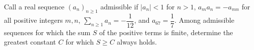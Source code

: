 Call a real sequence $(a_n)_{n\ge1}$ admissible if $|a_n|<1$ for $n>1$, $a_ma_n=-a_{mn}$ for all positive integers $m,n$, $\sum_{n\ge1}a_n=-\dfrac{1}{12}$, and $a_{67}=\dfrac{1}{7}$. Among admissible sequences for which the sum $S$ of the positive terms is finite, determine the greatest constant $C$ for which $S\ge C$ always holds.
